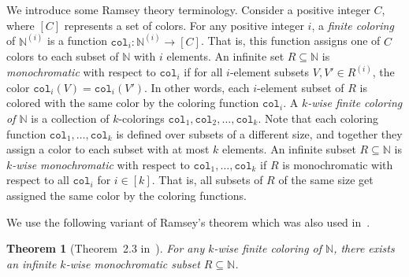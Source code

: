 \documentclass[11pt]{article}
\numberwithin{equation}{section}
\newtheorem{theorem}{Theorem}[section]
\theoremstyle{definition}
\theoremstyle{plain}
\newcommand{\N}{\mathbb N}
\begin{document}
We introduce some Ramsey theory terminology.
Consider a positive integer $C$, where $[C]$ represents a set of colors.
For any positive integer $i$, a \emph{finite coloring} of $\N^{(i)}$ is a function $\texttt{col}_i:\N^{(i)} \to [C]$. That is, this function assigns one of $C$ colors to each subset of $\N$ with $i$ elements. 
An infinite set $R \subseteq \N$ is \emph{monochromatic} with respect to $\texttt{col}_i$ if for all $i$-element subsets $V, V' \in R^{(i)}$, the color $\texttt{col}_i(V) = \texttt{col}_i(V')$. In other words, each $i$-element subset of $R$ is colored with the same color by the coloring function $\texttt{col}_i$.
 A \emph{$k$-wise finite coloring of $\N$} is a collection of $k$-colorings $\texttt{col}_1, \texttt{col}_2, \ldots, \texttt{col}_k$.
Note that each coloring function $\texttt{col}_1, \ldots, \texttt{col}_k$ is defined over subsets of a different size, and together they assign a color to each subset with at most $k$ elements.
An infinite subset $R \subseteq \N$ is \emph{$k$-wise monochromatic}
with respect to $\texttt{col}_1, \ldots, \texttt{col}_k$ if $R$ is monochromatic with respect to all $\texttt{col}_i$ for $i \in [k]$. That is, all subsets of $R$ of the same size get assigned the same color by the coloring functions.

We use the following variant of Ramsey's theorem which was also used in~\cite{Fis04,CS14}.

\begin{theorem}[Theorem~2.3 in~\cite{CS14}]\label{thm:ramsey}
For any $k$-wise finite coloring of $\N$, there exists an infinite $k$-wise monochromatic subset $R \subseteq \N$.
\end{theorem}
\end{document}
